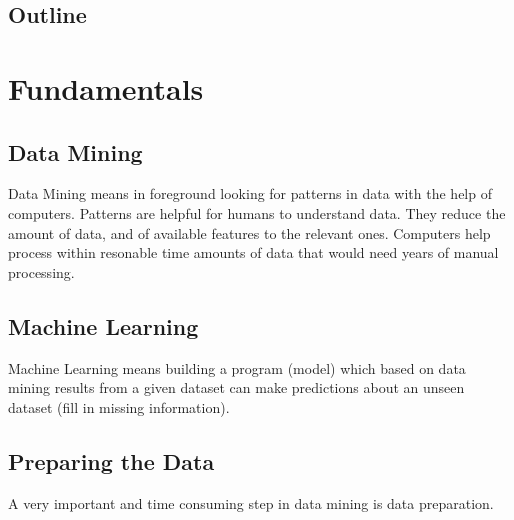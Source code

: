 \documentclass[a4paper]{scrreprt}
\begin{document}
\section{Outline}

\chapter{Fundamentals}
\section{Data Mining}
Data Mining means in foreground looking for patterns in data with the help of computers. Patterns are helpful for humans to understand data. They reduce the amount of data, and of available features to the relevant ones. Computers help process within resonable time amounts of data that would need years of manual processing.
\section{Machine Learning}
Machine Learning means building a program (model) which based on data mining results from a given dataset can make predictions about an unseen dataset  (fill in missing information). 
\section{Preparing the Data}
A very important and time consuming step in data mining is data preparation. 
\end{document}
